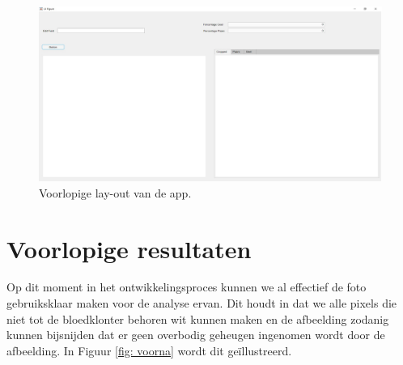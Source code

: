 \documentclass[a4paper,kulak]{kulakarticle}
\begin{document}
		\begin{figure}[h]
			\centering
			\includegraphics[width=170mm]{app.jpg}
			\caption{Voorlopige lay-out van de app.}
			\label{fig: app}
		\end{figure}
	
		
	

	\section{Voorlopige resultaten}		
		Op dit moment in het ontwikkelingsproces kunnen we al effectief de foto gebruiksklaar maken voor de analyse ervan. Dit houdt in dat we alle pixels die niet tot de bloedklonter behoren wit kunnen maken en de afbeelding zodanig kunnen bijsnijden dat er geen overbodig geheugen ingenomen wordt door de afbeelding. In Figuur \ref{fig: voorna} wordt dit geïllustreerd.\\
	
\end{document}
